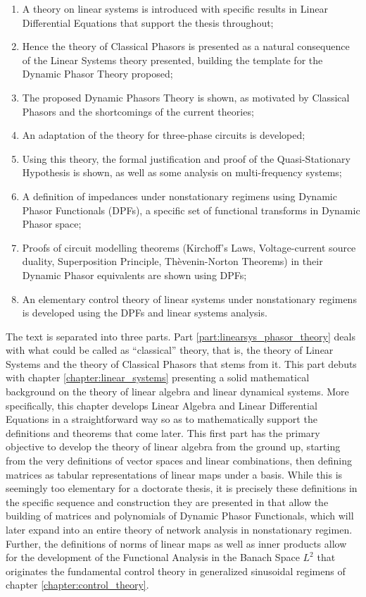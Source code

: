 \begin{enumerate}
	\item A theory on linear systems is introduced with specific results in Linear Differential Equations that support the thesis throughout;
	\item Hence the theory of Classical Phasors is presented as a natural consequence of the Linear Systems theory presented, building the template for the Dynamic Phasor Theory proposed;
	\item The proposed Dynamic Phasors Theory is shown, as motivated by Classical Phasors and the shortcomings of the current theories;
	\item An adaptation of the theory for three-phase circuits is developed;
	\item Using this theory, the formal justification and proof of the Quasi-Stationary Hypothesis is shown, as well as some analysis on multi-frequency systems;
	\item A definition of impedances under nonstationary regimens using Dynamic Phasor Functionals (DPFs), a specific set of functional transforms in Dynamic Phasor space;
	\item Proofs of circuit modelling theorems (Kirchoff's Laws, Voltage-current source duality, Superposition Principle, Thèvenin-Norton Theorems) in their Dynamic Phasor equivalents are shown using DPFs;
	\item An elementary control theory of linear systems under nonstationary regimens is developed using the DPFs and linear systems analysis.
\end{enumerate}

	The text is separated into three parts. Part \ref{part:linearsys_phasor_theory} deals with what could be called as ``classical'' theory, that is, the theory of Linear Systems and the theory of Classical Phasors that stems from it. This part debuts with chapter \ref{chapter:linear_systems} presenting a solid mathematical background on the theory of linear algebra and linear dynamical systems. More specifically, this chapter develops Linear Algebra and Linear Differential Equations in a straightforward way so as to mathematically support the definitions and theorems that come later. This first part has the primary objective to develop the theory of linear algebra from the ground up, starting from the very definitions of vector spaces and linear combinations, then defining matrices as tabular representations of linear maps under a basis. While this is seemingly too elementary for a doctorate thesis, it is precisely these definitions in the specific sequence and construction they are presented in that allow the building of matrices and polynomials of Dynamic Phasor Functionals, which will later expand into an entire theory of network analysis in nonstationary regimen. Further, the definitions of norms of linear maps as well as inner products allow for the development of the Functional Analysis in the Banach Space $L^2$ that originates the fundamental control theory in generalized sinusoidal regimens of chapter \ref{chapter:control_theory}.


